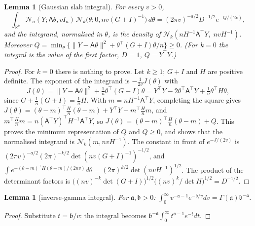 \documentclass[11pt]{article}
\newtheorem{lemma}[theorem]{Lemma}
\theoremstyle{remark}
\newcommand{\R}{\mathbb R}
\newcommand{\N}{\mathcal N}
\newcommand{\tr}{^{\top}}
\begin{document}
\begin{lemma}[Gaussian slab integral]\label{lem:slab}
For every $v>0$,
\[
\int_{\R^k}\N_a(Y;\mathsf{A}\theta,vI_a)\,\N_k\big(\theta;0,nv(G+I)^{-1}\big)\,d\theta=(2\pi v)^{-a/2}D^{-1/2}e^{-Q/(2v)},
\]
and the integrand, normalised in $\theta$, is the density of $\N_k(nH^{-1}\mathsf{A}\tr Y,\;nvH^{-1})$. Moreover $Q=\min_\theta\{\|Y-\mathsf{A}\theta\|^2+\theta\tr(G+I)\theta/n\}\ge0$. (For $k=0$ the integral is the value of the first factor, $D=1$, $Q=Y\tr Y$.)
\end{lemma}
\begin{proof}
For $k=0$ there is nothing to prove. Let $k\ge1$; $G+I$ and $H$ are positive definite. The exponent of the integrand is $-\frac1{2v}J(\theta)$ with
\[
J(\theta)=\|Y-\mathsf{A}\theta\|^2+\tfrac1n\theta\tr(G+I)\theta=Y\tr Y-2\theta\tr \mathsf{A}\tr Y+\tfrac1n\theta\tr H\theta ,
\]
since $G+\frac1n(G+I)=\frac1nH$. With $m=nH^{-1}\mathsf{A}\tr Y$, completing the square gives $J(\theta)=(\theta-m)\tr\frac Hn(\theta-m)+Y\tr Y-m\tr\frac Hn m$, and $m\tr\frac Hnm=n(\mathsf{A}\tr Y)\tr H^{-1}\mathsf{A}\tr Y$, so $J(\theta)=(\theta-m)\tr\frac Hn(\theta-m)+Q$. This proves the minimum representation of $Q$ and $Q\ge0$, and shows that the normalised integrand is $\N_k(m,nvH^{-1})$. The constant in front of $e^{-J/(2v)}$ is $(2\pi v)^{-a/2}(2\pi)^{-k/2}\det(nv(G+I)^{-1})^{-1/2}$, and $\int e^{-(\theta-m)\tr H(\theta-m)/(2nv)}d\theta=(2\pi)^{k/2}\det(nvH^{-1})^{1/2}$. The product of the determinant factors is $\big((nv)^{-k}\det(G+I)\big)^{1/2}\big((nv)^k/\det H\big)^{1/2}=D^{-1/2}$.
\end{proof}

\begin{lemma}[inverse-gamma integral]\label{lem:IGint}
For $\mathfrak a,\mathfrak b>0$: $\int_0^\infty v^{-\mathfrak a-1}e^{-\mathfrak b/v}dv=\Gamma(\mathfrak a)\mathfrak b^{-\mathfrak a}$.
\end{lemma}
\begin{proof}
Substitute $t=\mathfrak b/v$: the integral becomes $\mathfrak b^{-\mathfrak a}\int_0^\infty t^{\mathfrak a-1}e^{-t}dt$.
\end{proof}
\end{document}

